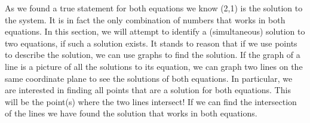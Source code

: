 As we found a true statement for both equations we know (2,1) is the solution
to the system. It is in fact the only combination of numbers that works in
both equations.  In this section, we will attempt to identify a (simultaneous) solution to two equations, if such a solution exists.  It stands to reason that if we use points to describe the solution, we can use graphs to find the solution.\pp
If the graph of a line is a picture of all the solutions to its equation, we can graph two
lines on the same coordinate plane to see the solutions of both equations. In particular, we
are interested in finding all points that are a solution for both equations.  This will be
the point(s) where the two lines intersect! If we can find the intersection of the lines we
have found the solution that works in both equations.%


